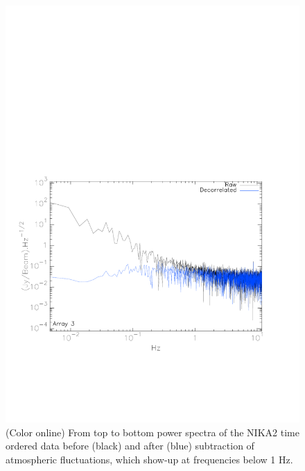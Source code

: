 \documentclass[]{aa} %
\begin{document}
\begin{figure}[h]
   \includegraphics[trim=1cm 4cm 2cm 12cm, clip=true,width=0.85\linewidth]{A3_noise_spec.pdf}     
    \caption{(Color online) From top to bottom power spectra of the NIKA2 time ordered data before (black) and after (blue) subtraction of atmospheric fluctuations, which show-up at frequencies below 1 Hz.}
         \label{fig:noisespec}
\end{figure}
\end{document}
